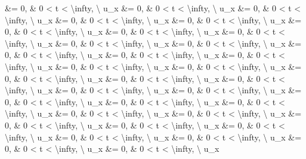 \documentclass[
]{article}
\begin{document}
\&= 0, \& 0 \textless{} t \textless{} \textbackslash infty,
\textbackslash{} u\_x \&= 0, \& 0 \textless{} t \textless{}
\textbackslash infty, \textbackslash{} u\_x \&= 0, \& 0 \textless{} t
\textless{} \textbackslash infty, \textbackslash{} u\_x \&= 0, \& 0
\textless{} t \textless{} \textbackslash infty, \textbackslash{} u\_x
\&= 0, \& 0 \textless{} t \textless{} \textbackslash infty,
\textbackslash{} u\_x \&= 0, \& 0 \textless{} t \textless{}
\textbackslash infty, \textbackslash{} u\_x \&= 0, \& 0 \textless{} t
\textless{} \textbackslash infty, \textbackslash{} u\_x \&= 0, \& 0
\textless{} t \textless{} \textbackslash infty, \textbackslash{} u\_x
\&= 0, \& 0 \textless{} t \textless{} \textbackslash infty,
\textbackslash{} u\_x \&= 0, \& 0 \textless{} t \textless{}
\textbackslash infty, \textbackslash{} u\_x \&= 0, \& 0 \textless{} t
\textless{} \textbackslash infty, \textbackslash{} u\_x \&= 0, \& 0
\textless{} t \textless{} \textbackslash infty, \textbackslash{} u\_x
\&= 0, \& 0 \textless{} t \textless{} \textbackslash infty,
\textbackslash{} u\_x \&= 0, \& 0 \textless{} t \textless{}
\textbackslash infty, \textbackslash{} u\_x \&= 0, \& 0 \textless{} t
\textless{} \textbackslash infty, \textbackslash{} u\_x \&= 0, \& 0
\textless{} t \textless{} \textbackslash infty, \textbackslash{} u\_x
\&= 0, \& 0 \textless{} t \textless{} \textbackslash infty,
\textbackslash{} u\_x \&= 0, \& 0 \textless{} t \textless{}
\textbackslash infty, \textbackslash{} u\_x \&= 0, \& 0 \textless{} t
\textless{} \textbackslash infty, \textbackslash{} u\_x \&= 0, \& 0
\textless{} t \textless{} \textbackslash infty, \textbackslash{} u\_x
\&= 0, \& 0 \textless{} t \textless{} \textbackslash infty,
\textbackslash{} u\_x \&= 0, \& 0 \textless{} t \textless{}
\textbackslash infty, \textbackslash{} u\_x \&= 0, \& 0 \textless{} t
\textless{} \textbackslash infty, \textbackslash{} u\_x \&= 0, \& 0
\textless{} t \textless{} \textbackslash infty, \textbackslash{} u\_x
\&= 0, \& 0 \textless{} t \textless{} \textbackslash infty,
\textbackslash{} u\_x \&= 0, \& 0 \textless{} t \textless{}
\textbackslash infty, \textbackslash{} u\_x \&= 0, \& 0 \textless{} t
\textless{} \textbackslash infty, \textbackslash{} u\_x \&= 0, \& 0
\textless{} t \textless{} \textbackslash infty, \textbackslash{} u\_x
\&= 0, \& 0 \textless{} t \textless{} \textbackslash infty,
\textbackslash{} u\_x \&= 0, \& 0 \textless{} t \textless{}
\textbackslash infty, \textbackslash{} u\_x \&= 0, \& 0 \textless{} t
\textless{} \textbackslash infty, \textbackslash{} u\_x \&= 0, \& 0
\textless{} t \textless{} \textbackslash infty, \textbackslash{} u\_x
\end{document}
